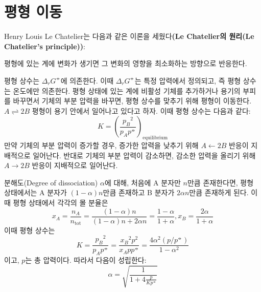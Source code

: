     \section{평형 이동}
        \hspace{\parindent} Henry Louis Le Chatelier는 다음과 같은 이론을 세웠다\textbf{(Le Chatelier의 원리(Le Chatelier's principle))}:
        \begin{law}[Le Chatelier의 원리]
        평형에 있는 계에 변화가 생기면 그 변화의 영향을 최소화하는 방향으로 반응한다.
        \end{law}
        \par 평형 상수는 $\Delta_r G^\circlehbar$에 의존한다. 이때 $\Delta_r G^\circlehbar$는 특정 압력에서 정의되고, 즉 평형 상수는 온도에만 의존한다. 
        평형 상태에 있는 계에 비활성 기체를 추가하거나 용기의 부피를 바꾸면서 기체의 부분 압력을 바꾸면, 평형 상수를 맞추기 위해 평형이 이동한다. $A\rightleftharpoons 2B$ 
        평형이 용기 안에서 일어나고 있다고 하자. 이때 평형 상수는 다음과 같다:
        \begin{equation*}
            K = \left(\frac{{p_B}^2}{p_A p^\circlehbar}\right)_\mathrm{equilibrium}
        \end{equation*}
        만약 기체의 부분 압력이 증가할 경우, 증가한 압력을 낮추기 위해 $A \leftarrow 2B$ 반응이 지배적으로 일어난다. 반대로 기체의 부분 압력이 감소하면, 
        감소한 압력을 올리기 위해 $A \rightarrow 2B$ 반응이 지배적으로 일어난다.
        \par 분해도(Degree of dissociation) $\alpha$에 대해, 처음에 A 분자만 $n$만큼 존재한다면, 평형 상태에서는 A 분자가 $\left(1-\alpha\right)n$만큼 존재하고 
        B 분자가 $2\alpha n$만큼 존재하게 된다. 이때 평형 상태에서 각각의 몰 분율은
        \begin{equation*}
            x_A = \frac{n_A}{n_\mathrm{tot}}=\frac{\left(1-\alpha\right)n}{\left(1-\alpha\right)n+2\alpha n}=\frac{1-\alpha}{1+\alpha}, x_B = \frac{2\alpha}{1+\alpha}
        \end{equation*}
        이때 평형 상수는 
        \begin{equation*}
            K=\frac{{p_B}^2}{p_A p^\circlehbar}=\frac{{x_B}^2 p^2}{x_A p p^\circlehbar}=\frac{4\alpha^2 \left(p/p^\circlehbar\right)}{1-\alpha^2}
        \end{equation*}
        이고, $p$는 총 압력이다. 따라서 다음이 성립한다:
        \begin{equation*}
            \alpha = \sqrt{\frac{1}{1+4\frac{p}{Kp^\circlehbar}}}
        \end{equation*}

